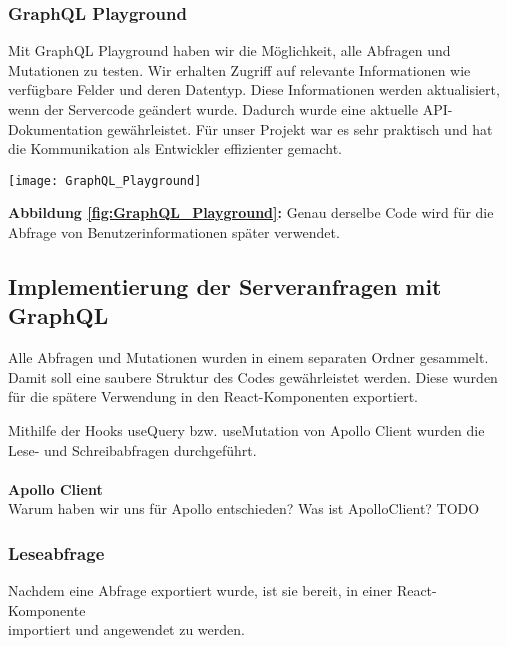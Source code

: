 \subsubsection{GraphQL Playground}
Mit GraphQL Playground haben wir die Möglichkeit, alle Abfragen und Mutationen zu testen. Wir erhalten Zugriff auf relevante Informationen wie verfügbare Felder und deren Datentyp. Diese Informationen werden aktualisiert, wenn der Servercode geändert wurde. Dadurch wurde eine aktuelle API-Dokumentation gewährleistet. Für unser Projekt war es sehr praktisch und hat die Kommunikation als Entwickler effizienter gemacht.
\\
\begin{center}
\texttt{[image: GraphQL\_Playground]}\label{fig:GraphQL_Playground}
\end{center}
\textbf{Abbildung \autoref{fig:GraphQL_Playground}:}
Genau derselbe Code wird für die Abfrage von Benutzerinformationen später verwendet.
\newpage

\subsection{Implementierung der Serveranfragen mit GraphQL}
Alle Abfragen und Mutationen wurden in einem separaten Ordner gesammelt.
Damit soll eine saubere Struktur des Codes gewährleistet werden.
Diese wurden für die spätere Verwendung in den React-Komponenten exportiert.

Mithilfe der Hooks useQuery bzw. useMutation von Apollo Client wurden die Lese- und Schreibabfragen durchgeführt.
\\\\
\textbf{Apollo Client}\\
Warum haben wir uns für Apollo entschieden? Was ist ApolloClient?
TODO
\newpage

\subsubsection{Leseabfrage}
Nachdem eine Abfrage exportiert wurde, ist sie bereit, in einer React-Komponente \\
importiert und angewendet zu werden.

